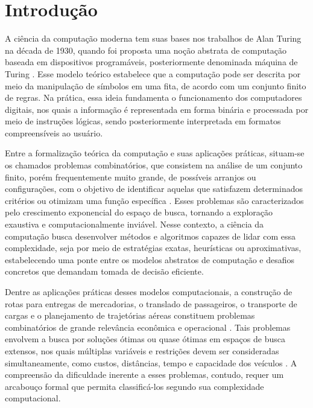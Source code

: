 
\chapter*[Introdução]{Introdução}

A ciência da computação moderna tem suas bases nos trabalhos de Alan Turing na década de 1930, quando foi proposta uma noção abstrata de computação baseada em dispositivos programáveis, posteriormente denominada máquina de Turing \cite{sipser1996introduction, farias2013introduccao}. Esse modelo teórico estabelece que a computação pode ser descrita por meio da manipulação de símbolos em uma fita, de acordo com um conjunto finito de regras. Na prática, essa ideia fundamenta o funcionamento dos computadores digitais, nos quais a informação é representada em forma binária e processada por meio de instruções lógicas, sendo posteriormente interpretada em formatos compreensíveis ao usuário. \cite{hopcroftintroduction}

Entre a formalização teórica da computação e suas aplicações práticas, situam-se os chamados problemas combinatórios, que consistem na análise de um conjunto finito,  porém frequentemente muito grande, de possíveis arranjos ou configurações, com o objetivo de identificar aquelas que satisfazem determinados critérios ou otimizam uma função específica \cite{papadimitriou1998combinatorial}. Esses problemas são caracterizados pelo crescimento exponencial do espaço de busca, tornando a exploração exaustiva e computacionalmente inviável. Nesse contexto, a ciência da computação busca desenvolver métodos e algoritmos capazes de lidar com essa complexidade, seja por meio de estratégias exatas, heurísticas ou aproximativas, estabelecendo uma ponte entre os modelos abstratos de computação e desafios concretos que demandam tomada de decisão eficiente.

Dentre as aplicações práticas desses modelos computacionais, a construção de rotas para entregas de mercadorias, o translado de passageiros, o transporte de cargas e o planejamento de trajetórias aéreas constituem problemas combinatórios de grande relevância econômica e operacional \cite{toth2002vehicle}. Tais problemas envolvem a busca por soluções ótimas ou quase ótimas em espaços de busca extensos, nos quais múltiplas variáveis e restrições devem ser consideradas simultaneamente, como custos, distâncias, tempo e capacidade dos veículos \cite{braekers2016vehicle}. A compreensão da dificuldade inerente a esses problemas, contudo, requer um arcabouço formal que permita classificá-los segundo sua complexidade computacional.

